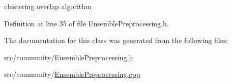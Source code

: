 clustering overlap algorithm 



Definition at line 35 of file Ensemble\-Preprocessing.\-h.



The documentation for this class was generated from the following files\-:\begin{DoxyCompactItemize}
\item 
src/community/\hyperlink{_ensemble_preprocessing_8h}{Ensemble\-Preprocessing.\-h}\item 
src/community/\hyperlink{_ensemble_preprocessing_8cpp}{Ensemble\-Preprocessing.\-cpp}\end{DoxyCompactItemize}
